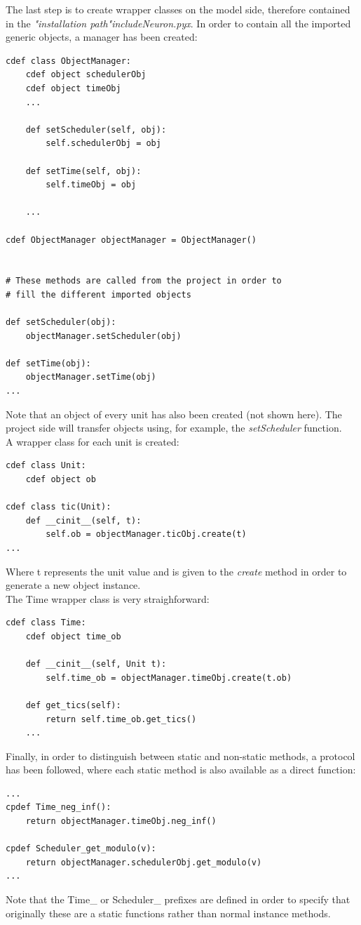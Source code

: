 \documentclass{article}
\begin{document}
The last step is to create wrapper classes on the model side, therefore contained in the \emph{"installation path"\/include\/Neuron.pyx}. In order to contain all the imported generic objects, a manager has been created:
\begin{verbatim}
cdef class ObjectManager:
    cdef object schedulerObj
    cdef object timeObj
    ...

    def setScheduler(self, obj):
        self.schedulerObj = obj

    def setTime(self, obj):
        self.timeObj = obj
        
    ...

cdef ObjectManager objectManager = ObjectManager()


# These methods are called from the project in order to
# fill the different imported objects

def setScheduler(obj):
    objectManager.setScheduler(obj)

def setTime(obj):
    objectManager.setTime(obj)
...
\end{verbatim}
Note that an object of every unit has also been created (not shown here). The project side will transfer objects using, for example, the \emph{setScheduler} function. \\
A wrapper class for each unit is created:
\begin{verbatim}
cdef class Unit:
    cdef object ob

cdef class tic(Unit):
    def __cinit__(self, t):
        self.ob = objectManager.ticObj.create(t)
...
\end{verbatim}
Where t represents the unit value and is given to the \emph{create} method in order to generate a new object instance. \\
The Time wrapper class is very straighforward:
\begin{verbatim}
cdef class Time:
    cdef object time_ob

    def __cinit__(self, Unit t):
        self.time_ob = objectManager.timeObj.create(t.ob)

    def get_tics(self):
        return self.time_ob.get_tics()
    ...
\end{verbatim}
Finally, in order to distinguish between static and non-static methods, a protocol has been followed, where each static method is also available as a direct function:
\begin{verbatim}
...
cpdef Time_neg_inf():
    return objectManager.timeObj.neg_inf()

cpdef Scheduler_get_modulo(v):
    return objectManager.schedulerObj.get_modulo(v)
...
\end{verbatim}
Note that the Time\_ or Scheduler\_ prefixes are defined in order to specify that originally these are a static functions rather than normal instance methods. \\ \\
\end{document}
